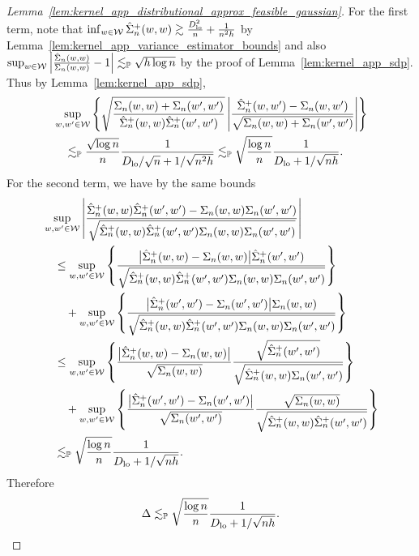\begin{proof}[%
  Lemma~\ref{lem:kernel_app_distributional_approx_feasible_gaussian}]
  For the first term, note that
  $\inf_{w \in \mathcal{W}} \hat \Sigma_n^+(w,w)
  \gtrsim \frac{D_{\textup{lo}}^2}{n} + \frac{1}{n^2h}$
  by Lemma~\ref{lem:kernel_app_variance_estimator_bounds} and also
  $\sup_{w \in \mathcal{W}}
  \left|\frac{\hat \Sigma_n(w,w)}{\Sigma_n(w,w)} - 1\right|
  \lesssim_{\mathbb{P}} \sqrt{h \log n}$
  by the proof of Lemma~\ref{lem:kernel_app_sdp}.
  Thus by Lemma~\ref{lem:kernel_app_sdp},
  \begin{align*}
    &\sup_{w, w' \in \mathcal{W}}
    \left\{
      \sqrt{\frac{\Sigma_n(w,w) + \Sigma_n(w',w')}
      {\hat \Sigma_n^+(w,w) \hat \Sigma_n^+(w',w')}}
      \left|
      \frac{\hat \Sigma_n^+(w,w') - \Sigma_n(w,w')}
      {\sqrt{\Sigma_n(w,w) + \Sigma_n(w',w')}}
      \right|
    \right\} \\
    &\quad\lesssim_{\mathbb{P}}
    \frac{\sqrt{\log n}}{n}
    \frac{1}{D_{\textup{lo}}/\sqrt{n} + 1/\sqrt{n^2h}}
    \lesssim_{\mathbb{P}}
    \sqrt{\frac{\log n}{n}}
    \frac{1}{D_{\textup{lo}} + 1/\sqrt{n h}}.
  \end{align*}
  For the second term, we have by the same bounds
  \begin{align*}
    &\sup_{w, w' \in \mathcal{W}}
    \left|
    \frac{\hat \Sigma_n^+(w,w) \hat \Sigma_n^+(w',w')
    - \Sigma_n(w,w) \Sigma_n(w',w')}
    {\sqrt{\hat \Sigma_n^+(w,w) \hat \Sigma_n^+(w',w')
    \Sigma_n(w,w) \Sigma_n(w',w')}}
    \right| \\
    &\quad\leq
    \sup_{w, w' \in \mathcal{W}}
    \left\{
      \frac{\big| \hat \Sigma_n^+(w,w) - \Sigma_n(w,w)\big|
      \hat \Sigma_n^+(w',w')}
      {\sqrt{\hat \Sigma_n^+(w,w) \hat \Sigma_n^+(w',w')
      \Sigma_n(w,w) \Sigma_n(w',w')}}
    \right\} \\
    &\qquad+
    \sup_{w, w' \in \mathcal{W}}
    \left\{
      \frac{\big| \hat \Sigma_n^+(w',w') - \Sigma_n(w',w')\big|
      \Sigma_n(w,w)}
      {\sqrt{\hat \Sigma_n^+(w,w) \hat \Sigma_n^+(w',w')
      \Sigma_n(w,w) \Sigma_n(w',w')}}
    \right\} \\
    &\quad\leq
    \sup_{w, w' \in \mathcal{W}}
    \left\{
      \frac{\big| \hat \Sigma_n^+(w,w) - \Sigma_n(w,w)\big|}
      {\sqrt{\Sigma_n(w,w)}}
      \frac{\sqrt{\hat \Sigma_n^+(w',w')}}
      {\sqrt{\hat \Sigma_n^+(w,w) \Sigma_n(w',w')}}
    \right\} \\
    &\qquad+
    \sup_{w, w' \in \mathcal{W}}
    \left\{
      \frac{\big| \hat \Sigma_n^+(w',w') - \Sigma_n(w',w')\big|}
      {\sqrt{\Sigma_n(w',w')}}
      \frac{\sqrt{\Sigma_n(w,w)}}
      {\sqrt{\hat \Sigma_n^+(w,w) \hat \Sigma_n^+(w',w')}}
    \right\} \\
    &\quad\lesssim_{\mathbb{P}}
    \sqrt{\frac{\log n}{n}}
    \frac{1}{D_{\textup{lo}} + 1/\sqrt{n h}}.
  \end{align*}
  Therefore
  \begin{align*}
    \Delta \lesssim_{\mathbb{P}}
    \sqrt{\frac{\log n}{n}}
    \frac{1}{D_{\textup{lo}} + 1/\sqrt{n h}}.
  \end{align*}


\end{proof}
